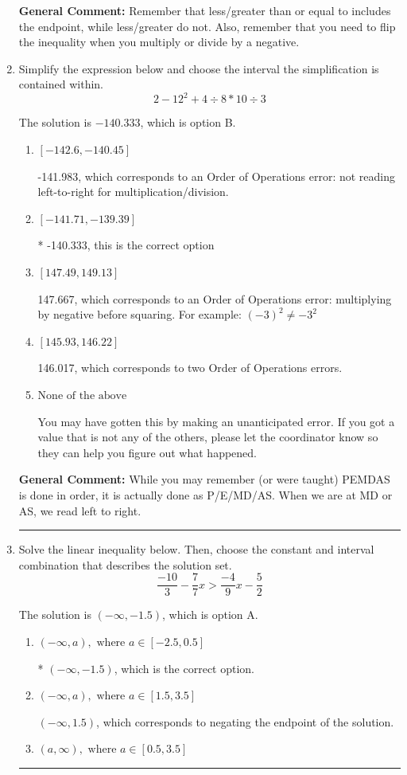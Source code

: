 \documentclass{extbook}[14pt]
\newcommand{\litem}[1]{\item #1

\rule{\textwidth}{0.4pt}}
\begin{document}
\begin{enumerate}
{\textbf{General Comment:} Remember that less/greater than or equal to includes the endpoint, while less/greater do not. Also, remember that you need to flip the inequality when you multiply or divide by a negative.
}
\litem{
Simplify the expression below and choose the interval the simplification is contained within.
\[ 2 - 12^2 + 4 \div 8 * 10 \div 3 \]

The solution is \( -140.333 \), which is option B.\begin{enumerate}[label=\Alph*.]
\item \( [-142.6, -140.45] \)

 -141.983, which corresponds to an Order of Operations error: not reading left-to-right for multiplication/division.
\item \( [-141.71, -139.39] \)

* -140.333, this is the correct option
\item \( [147.49, 149.13] \)

 147.667, which corresponds to an Order of Operations error: multiplying by negative before squaring. For example: $(-3)^2 \neq -3^2$
\item \( [145.93, 146.22] \)

 146.017, which corresponds to two Order of Operations errors.
\item \( \text{None of the above} \)

 You may have gotten this by making an unanticipated error. If you got a value that is not any of the others, please let the coordinator know so they can help you figure out what happened.
\end{enumerate}

\textbf{General Comment:} While you may remember (or were taught) PEMDAS is done in order, it is actually done as P/E/MD/AS. When we are at MD or AS, we read left to right.
}
\litem{
Solve the linear inequality below. Then, choose the constant and interval combination that describes the solution set.
\[ \frac{-10}{3} - \frac{7}{7} x > \frac{-4}{9} x - \frac{5}{2} \]

The solution is \( (-\infty, -1.5) \), which is option A.\begin{enumerate}[label=\Alph*.]
\item \( (-\infty, a), \text{ where } a \in [-2.5, 0.5] \)

* $(-\infty, -1.5)$, which is the correct option.
\item \( (-\infty, a), \text{ where } a \in [1.5, 3.5] \)

 $(-\infty, 1.5)$, which corresponds to negating the endpoint of the solution.
\item \( (a, \infty), \text{ where } a \in [0.5, 3.5] \)


\end{enumerate}}
\end{enumerate}
\end{document}
